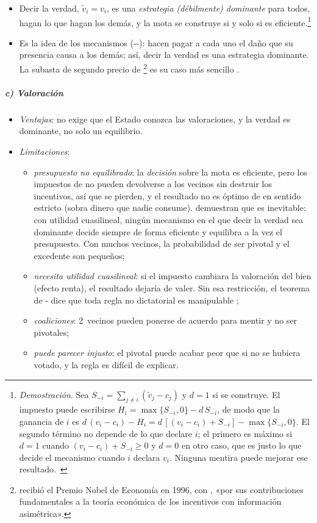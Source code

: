 \documentclass[11pt]{article}
\begin{document}
\begin{itemize}
\item Decir la verdad, $\tilde{v}_i=v_i$, es una \emph{estrategia (débilmente) dominante} para todos, hagan lo que hagan los demás, y la mota se construye si y solo si es eficiente.\footnote{\emph{Demostración}. Sea $S_{-i}=\sum_{j\neq i}(\tilde{v}_j-c_j)$ y $d=1$ si se construye. El impuesto puede escribirse $H_i=\max\{S_{-i},0\}-d\,S_{-i}$, de modo que la ganancia de $i$ es $d\,(v_i-c_i)-H_i=d\,[(v_i-c_i)+S_{-i}]-\max\{S_{-i},0\}$. El segundo término no depende de lo que declare $i$; el primero es máximo si $d=1$ cuando $(v_i-c_i)+S_{-i}\geq0$ y $d=0$ en otro caso, que es justo lo que decide el mecanismo cuando $i$ declara $v_i$. Ninguna mentira puede mejorar ese resultado.~\findemo}
\item Es la idea de los mecanismos  (--): hacen pagar a cada uno el daño que su presencia causa a los demás; así, decir la verdad es una estrategia dominante. La subasta de segundo precio de \textcite{Vickrey1961Counterspeculation}\footnote{ recibió el Premio Nobel de Economía en 1996, con , «por sus contribuciones fundamentales a la teoría económica de los incentivos con información asimétrica»\nocite{Nobel1996MirrleesVickrey}.} es su caso más sencillo .
\end{itemize}

\subparagraph{c) Valoración}
\begin{itemize}
\item \emph{Ventajas}: no exige que el Estado conozca las valoraciones, y la verdad es dominante, no solo un equilibrio.
\item \emph{Limitaciones}:
  \begin{itemize}
  \item \emph{presupuesto no equilibrado}: la \emph{decisión} sobre la mota es eficiente, pero los impuestos de  no pueden devolverse a los vecinos sin destruir los incentivos, así que se pierden, y el resultado no es óptimo de  en sentido estricto (sobra dinero que nadie consume). \textcite{GreenLaffont1977Characterization} demuestran que es inevitable: con utilidad cuasilineal, ningún mecanismo en el que decir la verdad sea dominante decide siempre de forma eficiente y equilibra a la vez el presupuesto. Con muchos vecinos, la probabilidad de ser pivotal y el excedente son pequeños;
  \item \emph{necesita utilidad cuasilineal}: si el impuesto cambiara la valoración del bien (efecto renta), el resultado dejaría de valer. Sin esa restricción, el teorema de - dice que toda regla no dictatorial es manipulable ;
  \item \emph{coaliciones}: 2~vecinos pueden ponerse de acuerdo para mentir y no ser pivotales;
  \item \emph{puede parecer injusto}: el pivotal puede acabar peor que si no se hubiera votado, y la regla es difícil de explicar.
  \end{itemize}
\end{itemize}
\end{document}
